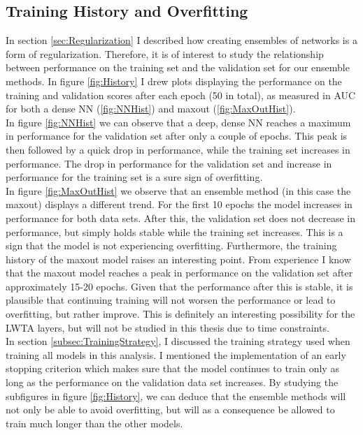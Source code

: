\subsection{Training History and Overfitting}\label{subsec:Overfitting}
In section \ref{sec:Regularization} I described how creating ensembles of networks is a form of regularization. Therefore,
it is of interest to study the relationship between performance on the training set and the validation set for our ensemble 
methods. In figure \ref{fig:History} I drew plots displaying the performance on the training and validation scores after each 
epoch (50 in total), as measured in \ac{AUC} for both a dense \ac{NN} (\ref{fig:NNHist}) and maxout (\ref{fig:MaxOutHist}).
\\ 
In figure \ref{fig:NNHist} we can observe that a deep, dense \ac{NN} reaches a maximum in performance for the validation set after only 
a couple of epochs. This peak is then followed by a quick drop in performance, while the training set increases in performance. 
The drop in performance for the validation set and increase in performance for the training set is a sure sign of overfitting. 
\\
In figure \ref{fig:MaxOutHist} we observe that an ensemble method (in this case the maxout) displays a different trend. For the first 
10 epochs the model increases in performance for both data sets. After this, the validation set does not decrease in performance, but 
simply holds stable while the training set increases. This is a sign that the model is not experiencing overfitting. Furthermore, the 
training history of the maxout model raises an interesting point. From experience I know that the maxout model reaches a peak in performance
on the validation set after approximately 15-20 epochs. Given that the performance after this is stable, it is plausible that continuing 
training will not worsen the performance or lead to overfitting, but rather improve. This is definitely an interesting possibility
for the \ac{LWTA} layers, but will not be studied in this thesis due to time constraints.
\\
In section \ref{subsec:TrainingStrategy}, I discussed the training strategy used when training all models in this analysis. I mentioned 
the implementation of an early stopping criterion which makes sure that the model continues to train only as long as the performance on the 
validation data set increases. By studying the subfigures in figure \ref{fig:History}, we can deduce that the ensemble methods will not only 
be able to avoid overfitting, but will as a consequence be allowed to train much longer than the other models.
